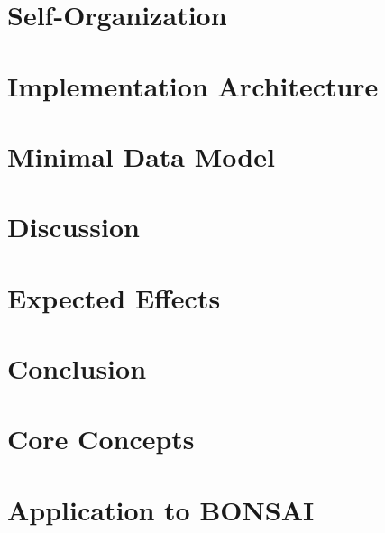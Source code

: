 \documentclass[11pt,a4paper]{article}
\begin{document}
\section{Self-Organization}
\section{Implementation Architecture}
\section{Minimal Data Model}
\section{Discussion}
\section{Expected Effects}
\section{Conclusion}

\appendix
\section{Core Concepts}
\section{Application to BONSAI}
\end{document}
